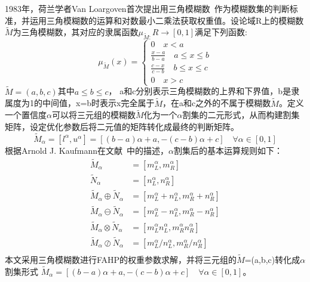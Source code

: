 1983年，荷兰学者Van Loargoven首次提出用三角模糊数~\cite{Wang2010Triangular,Chou2003The}作为模糊数集的判断标准，并运用三角模糊数的运算和对数最小二乘法获取权重值。设论域R上的模糊数$\widetilde{M}$为三角模糊数，其对应的隶属函数\begin{math}\mu_{\widetilde{M}:}R\to[0,1]\end{math}满足下列函数:
\begin{equation}
\mu_{\widetilde{M}}(x) = \left\{\begin{array}{l}
0 \quad x<a \\ [0.2cm]
\frac{x-a}{b-a} \quad a\le x\le b \\ [0.2cm]
\frac{c-x}{c-b} \quad b\le x\le c \\ [0.2cm]
0 \quad x>c
\end{array}\right.
\end{equation}
$\widetilde{M}=(a,b,c)$其中\begin{math}a\le b\le c\end{math}，
a和c分别表示三角模糊数的上界和下界值，b是隶属度为1的中间值，x=b时表示x完全属于$\widetilde{M}$，在a和c之外的不属于模糊数$\widetilde{M}$。定义一个置信度\begin{math}\alpha\end{math}可以将三元组的模糊数$\widetilde{M}$化为一个$\alpha$割集的二元形式，从而构建割集矩阵，设定优化参数后将二元值的矩阵转化成最终的判断矩阵。
\begin{equation}
	\widetilde{M}_{\alpha} = [l^{\alpha},u^{\alpha}]=[(b-a)\alpha+a,-(c-b)\alpha+c] \quad \forall \alpha\in[0,1]
\end{equation}
根据Arnold J. Kaufmann在文献~中的描述，$\alpha$割集后的基本运算规则如下：
\begin{equation}
\begin{split}
	\widetilde{M}_{\alpha} &= [m_{L}^{\alpha},m_{R}^{\alpha}] \\[0.2cm]
	\widetilde{N}_{\alpha} &= [n_{L}^{\alpha},n_{R}^{\alpha}] \\[0.2cm]
	\widetilde{M}_{\alpha}\oplus \widetilde{N}_{\alpha} &= [m_{L}^{\alpha}+n_{L}^{\alpha},m_{R}^{\alpha}+n_{R}^{\alpha}] \\[0.2cm]
	\widetilde{M}_{\alpha}\ominus \widetilde{N}_{\alpha} &= [m_{L}^{\alpha}-n_{L}^{\alpha},m_{R}^{\alpha}-n_{R}^{\alpha}] \\[0.2cm]
	\widetilde{M}_{\alpha}\otimes \widetilde{N}_{\alpha} &= [m_{L}^{\alpha}n_{L}^{\alpha},m_{R}^{\alpha}n_{R}^{\alpha}] \\[0.2cm]
	\widetilde{M}_{\alpha}\oslash \widetilde{N}_{\alpha} &= [m_{L}^{\alpha}/n_{L}^{\alpha},m_{R}^{\alpha}/n_{R}^{\alpha}] \\[0.2cm]
	\end{split}
\end{equation}
本文采用三角模糊数进行FAHP的权重参数求解，并将三元组的$\widetilde{M}$=(a,b,c)转化成$\alpha$割集形式
$\widetilde{M}_{\alpha} =[(b-a)\alpha+a,-(c-b)\alpha+c] \quad \forall \alpha\in[0,1]$。

